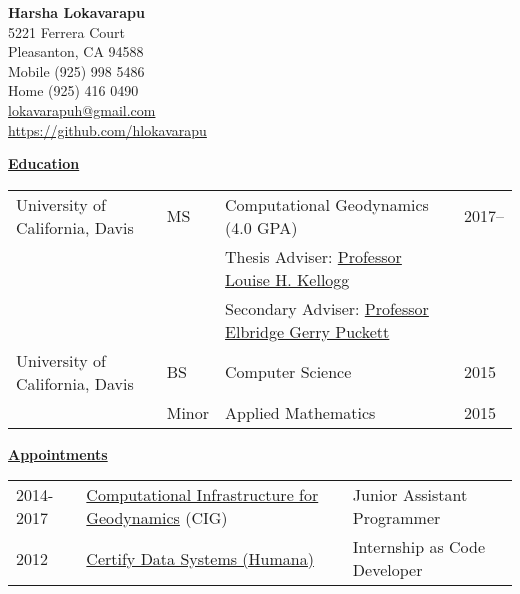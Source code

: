 \documentclass[11pt]{ltxdoc}
\begin{document}
\begin{center}
  \textbf{Harsha Lokavarapu}                                            \\ [06pt]
  5221 Ferrera Court                                                    \\
  Pleasanton, CA 94588                                                  \\
  Mobile (925) 998 5486                                                 \\
  Home   (925) 416 0490                                                 \\
 \href{mailto:lokavarapuh@gmail.com}{lokavarapuh@gmail.com}             \\
  \href{https://github.com/hlokavarapu}{https://github.com/hlokavarapu} \\ [3pt]
\end{center}


\vskip 12pt

\begin{center}
	\textbf{\underline{Education}}
\end{center}

\vskip -06pt

\begin{tabular}{llll}
University of California, Davis              &MS       &Computational Geodynamics (4.0 GPA)      & 2017-- \\
                                             &       &Thesis Adviser: \href{http://geology.ucdavis.edu/people/faculty/kellogg.php}{Professor Louise H. Kellogg}        &  \\
                                                     &       &Secondary Adviser: \href{https://www.math.ucdavis.edu/~egp/CV/E_G_Pucketts_CV.pdf}{ Professor Elbridge Gerry Puckett}      &  \\
University of California, Davis              &BS      & Computer Science                         & 2015       \\
                                             &Minor   & Applied Mathematics                      & 2015
\end{tabular}

\vskip 18pt

\begin{center}
	\textbf{\underline{Appointments}}
\end{center}

\begin{tabular}{lll}
2014-2017     & \href{https://geodynamics.org/cig/}{Computational Infrastructure for Geodynamics} (CIG) & Junior Assistant Programmer \\
2012       & \href{https://www.humana.com}{Certify Data Systems (Humana)} & Internship as Code Developer
\end{tabular}
\end{document}
